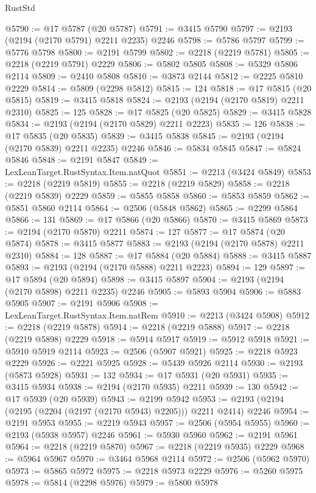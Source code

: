 \begin{lexlean}{RustStd}
\begin{coremodule}
@5790 := @17 @5787 (@20 @5787)
@5791 := @3415 @5790
@5797 := @2193 (@2194 (@2170 @5791) @2211 @2235) @2246
@5798 := @5786 @5797
@5799 := @5776 @5798
@5800 := @2191 @5799
@5802 := @2218 (@2219 @5781)
@5805 := @2218 (@2219 @5791) @2229
@5806 := @5802 @5805
@5808 := @5329 @5806 @2114
@5809 := @2410 @5808
@5810 := @3873 @2144
@5812 := @2225 @5810 @2229
@5814 := @5809 (@2298 @5812)
@5815 := 124
@5818 := @17 @5815 (@20 @5815)
@5819 := @3415 @5818
@5824 := @2193 (@2194 (@2170 @5819) @2211 @2310)
@5825 := 125
@5828 := @17 @5825 (@20 @5825)
@5829 := @3415 @5828
@5834 := @2193 (@2194 (@2170 @5829) @2211 @2223)
@5835 := 126
@5838 := @17 @5835 (@20 @5835)
@5839 := @3415 @5838
@5845 := @2193 (@2194 (@2170 @5839) @2211 @2235) @2246
@5846 := @5834 @5845
@5847 := @5824 @5846
@5848 := @2191 @5847
@5849 := LexLeanTarget.RustSyntax.Item.natQuot
@5851 := @2213 (@3424 @5849)
@5853 := @2218 (@2219 @5819)
@5855 := @2218 (@2219 @5829)
@5858 := @2218 (@2219 @5839) @2229
@5859 := @5855 @5858
@5860 := @5853 @5859
@5862 := @5851 @5860 @2114
@5864 := @2506 (@5848 @5862)
@5865 := @2299 @5864
@5866 := 131
@5869 := @17 @5866 (@20 @5866)
@5870 := @3415 @5869
@5873 := @2194 (@2170 @5870) @2211
@5874 := 127
@5877 := @17 @5874 (@20 @5874)
@5878 := @3415 @5877
@5883 := @2193 (@2194 (@2170 @5878) @2211 @2310)
@5884 := 128
@5887 := @17 @5884 (@20 @5884)
@5888 := @3415 @5887
@5893 := @2193 (@2194 (@2170 @5888) @2211 @2223)
@5894 := 129
@5897 := @17 @5894 (@20 @5894)
@5898 := @3415 @5897
@5904 := @2193 (@2194 (@2170 @5898) @2211 @2235) @2246
@5905 := @5893 @5904
@5906 := @5883 @5905
@5907 := @2191 @5906
@5908 := LexLeanTarget.RustSyntax.Item.natRem
@5910 := @2213 (@3424 @5908)
@5912 := @2218 (@2219 @5878)
@5914 := @2218 (@2219 @5888)
@5917 := @2218 (@2219 @5898) @2229
@5918 := @5914 @5917
@5919 := @5912 @5918
@5921 := @5910 @5919 @2114
@5923 := @2506 (@5907 @5921)
@5925 := @2218 @5923 @2229
@5926 := @2221 @5925
@5928 := @5439 @5926 @2114
@5930 := @2193 (@5873 @5928)
@5931 := 132
@5934 := @17 @5931 (@20 @5931)
@5935 := @3415 @5934
@5938 := @2194 (@2170 @5935) @2211
@5939 := 130
@5942 := @17 @5939 (@20 @5939)
@5943 := @2199 @5942
@5953 := @2193 (@2194 (@2195 (@2204 (@2197 (@2170 @5943) @2205))) @2211 @2414) @2246
@5954 := @2191 @5953
@5955 := @2219 @5943
@5957 := @2506 (@5954 @5955)
@5960 := @2193 (@5938 @5957) @2246
@5961 := @5930 @5960
@5962 := @2191 @5961
@5964 := @2218 (@2219 @5870)
@5967 := @2218 (@2219 @5935) @2229
@5968 := @5964 @5967
@5970 := @3464 @5968 @2114
@5972 := @2506 (@5962 @5970)
@5973 := @5865 @5972
@5975 := @2218 @5973 @2229
@5976 := @5260 @5975
@5978 := @5814 (@2298 @5976)
@5979 := @5800 @5978

\end{coremodule}
\end{lexlean}
